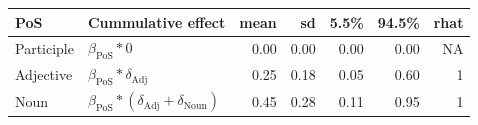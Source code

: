 
\begin{tabular}[t]{llrrrrr}
\toprule
PoS & Cummulative effect & mean & sd & 5.5\% & 94.5\% & rhat\\
\midrule
Participle & $\beta_{\text{PoS}} * 0$ & 0.00 & 0.00 & 0.00 & 0.00 & NA\\
Adjective & $\beta_{\text{PoS}} * \delta_{\text{Adj}}$ & 0.25 & 0.18 & 0.05 & 0.60 & 1\\
Noun & $\beta_{\text{PoS}} * (\delta_{\text{Adj}} + \delta_{\text{Noun}})$ & 0.45 & 0.28 & 0.11 & 0.95 & 1\\
\bottomrule
\end{tabular}
